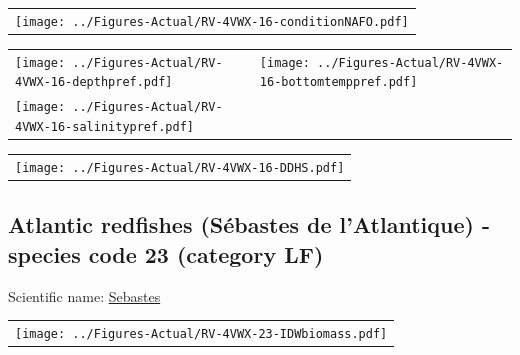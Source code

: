 \documentclass[12pt]{article}\usepackage[]{graphicx}\usepackage[]{color}
\begin{document}
\vspace{1cm}
\begin{minipage}{1.0\textwidth}
 \begin{tabular}{c}
\texttt{[image: ../Figures-Actual/RV-4VWX-16-conditionNAFO.pdf]} \\ 
\end{tabular} 
\end{minipage}
\clearpage
\begin{minipage}{1.0\textwidth}
 \begin{tabular}[t]{m{3in}m{3in}}
\texttt{[image: ../Figures-Actual/RV-4VWX-16-depthpref.pdf]} & 
\texttt{[image: ../Figures-Actual/RV-4VWX-16-bottomtemppref.pdf]} \\ 
\texttt{[image: ../Figures-Actual/RV-4VWX-16-salinitypref.pdf]} & 
 \\ 
\end{tabular} 
\end{minipage}
\newline

\vspace{1cm}
\begin{minipage}{1.0\textwidth}
 \begin{tabular}{c}
\texttt{[image: ../Figures-Actual/RV-4VWX-16-DDHS.pdf]} \\ 
\end{tabular} 
\end{minipage}
\clearpage

\renewcommand\thefigure{\thesubsection\Alph{figure}}

\setcounter{figure}{0}

\hypertarget{sec:23}{%
\subsection{Atlantic redfishes (Sébastes de l'Atlantique) - species code 23 (category LF)}\label{sec:23}}

  


Scientific name: \href{http://www.marinespecies.org/aphia.php?p=taxdetails\&id=126175}{Sebastes} \newline
\begin{minipage}{1.0\textwidth}
 \begin{tabular}{c}
\texttt{[image: ../Figures-Actual/RV-4VWX-23-IDWbiomass.pdf]} \\ 
\end{tabular} 
\end{minipage}
\newline
\end{document}
